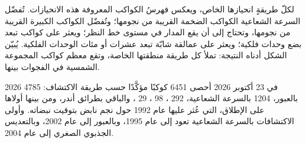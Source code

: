 لكلّ طريقةٍ انحيازها الخاص، ويعكس فهرسُ الكواكب المعروفة
هذه الانحيازات. تُفضّل السرعة الشعاعية الكواكب الضخمة القريبة من
نجومها؛ وتُفضّل  الكواكب الكبيرة القريبة من نجومها، وتحتاج إلى
أن يقع المدار في مستوى خط النظر؛ ويعثر  على كواكب
تبعد بضع وحدات فلكية؛ ويعثر  على عمالقة شابّة تبعد عشرات أو مئات الوحدات الفلكية.
يُبيّن الشكل أدناه النتيجة: تملأ كل طريقة منطقتها الخاصة،
وتقع معظم كواكب المجموعة الشمسية في الفجوات بينها.

\begin{dated}{2026}
في 23 أكتوبر 2026 أحصى  6451 كوكبًا مؤكَّدًا
حسب طريقة الاكتشاف: 4785 بالعبور، 1204 بالسرعة الشعاعية،
292 ، 98 ، 29 ، والباقي
بطرائق أندر، ومن بينها أولاها على الإطلاق،
التي عُثر عليها عام 1992 حول نجم نابض بتوقيت نبضاته. وأولى
الاكتشافات بالسرعة الشعاعية تعود إلى عام 1995، وبالعبور إلى عام 2002،
وبالتعديس الجذبوي الصغري  إلى عام 2004.
\end{dated}

